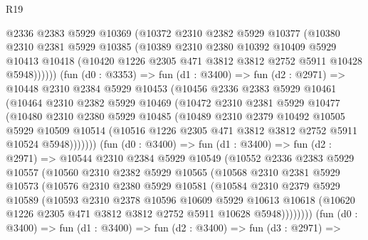 \begin{lexlean}{R19}
\begin{coremodule}
            @2336
            @2383
            @5929
            @10369
            (@10372
              @2310
              @2382
              @5929
              @10377
              (@10380
                @2310
                @2381
                @5929
                @10385
                (@10389
                  @2310
                  @2380
                  @10392
                  @10409
                  @5929
                  @10413
                  @10418
                  (@10420 @1226 @2305 @471 @3812 @3812 @2752 @5911 @10428 @5948))))))
        (fun (d0 : @3353) =>
        fun (d1 : @3400) =>
        fun (d2 : @2971) =>
        @10448
          @2310
          @2384
          @5929
          @10453
          (@10456
            @2336
            @2383
            @5929
            @10461
            (@10464
              @2310
              @2382
              @5929
              @10469
              (@10472
                @2310
                @2381
                @5929
                @10477
                (@10480
                  @2310
                  @2380
                  @5929
                  @10485
                  (@10489
                    @2310
                    @2379
                    @10492
                    @10505
                    @5929
                    @10509
                    @10514
                    (@10516 @1226 @2305 @471 @3812 @3812 @2752 @5911 @10524 @5948)))))))
        (fun (d0 : @3400) =>
        fun (d1 : @3400) =>
        fun (d2 : @2971) =>
        @10544
          @2310
          @2384
          @5929
          @10549
          (@10552
            @2336
            @2383
            @5929
            @10557
            (@10560
              @2310
              @2382
              @5929
              @10565
              (@10568
                @2310
                @2381
                @5929
                @10573
                (@10576
                  @2310
                  @2380
                  @5929
                  @10581
                  (@10584
                    @2310
                    @2379
                    @5929
                    @10589
                    (@10593
                      @2310
                      @2378
                      @10596
                      @10609
                      @5929
                      @10613
                      @10618
                      (@10620 @1226 @2305 @471 @3812 @3812 @2752 @5911 @10628 @5948))))))))
        (fun (d0 : @3400) =>
        fun (d1 : @3400) =>
        fun (d2 : @3400) =>
        fun (d3 : @2971) =>

\end{coremodule}
\end{lexlean}
